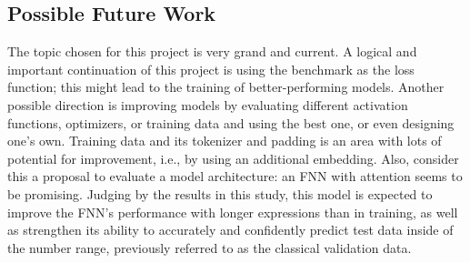 \documentclass{article}
\begin{document}
\subsection{Possible Future Work}
The topic chosen for this project is very grand and current. A logical and important continuation of this project is using the benchmark as the loss function; this might lead to the training of better-performing models. Another possible direction is improving models by evaluating different activation functions, optimizers, or training data and using the best one, or even designing one's own. Training data and its tokenizer and padding is an area with lots of potential for improvement, i.e., by using an additional embedding. Also, consider this a proposal to evaluate a model architecture: an FNN with attention seems to be promising. Judging by the results in this study, this model is expected to improve the FNN's performance with longer expressions than in training, as well as strengthen its ability to accurately and confidently predict test data inside of the number range, previously referred to as the classical validation data.

\newpage
\printbibliography[heading=bibintoc]
\end{document}
